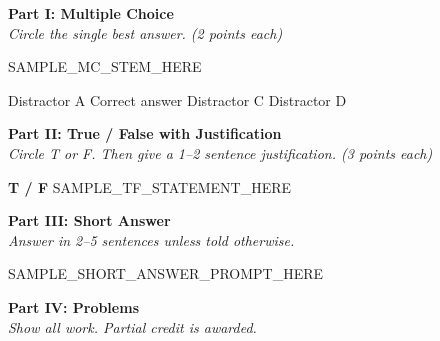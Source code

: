 \documentclass[11pt,addpoints]{exam}
\newcommand{\1}{\mathbf{1}}
\begin{document}
\newpage
\begin{center}
  {\large \textbf{Part I: Multiple Choice}} \\[3pt]
  \textit{Circle the single best answer. (2 points each)}
\end{center}

\begin{questions}

\question[2]
SAMPLE_MC_STEM_HERE
\begin{choices}
  \choice Distractor A
  \CorrectChoice Correct answer
  \choice Distractor C
  \choice Distractor D
\end{choices}


\newpage
\begin{center}
  {\large \textbf{Part II: True / False with Justification}} \\[3pt]
  \textit{Circle T or F. Then give a 1--2 sentence justification. (3 points each)}
\end{center}

\question[3]
\textbf{T \quad / \quad F} \quad SAMPLE_TF_STATEMENT_HERE
\vspace{1.2cm}


\newpage
\begin{center}
  {\large \textbf{Part III: Short Answer}} \\[3pt]
  \textit{Answer in 2--5 sentences unless told otherwise.}
\end{center}

\question[7]
SAMPLE_SHORT_ANSWER_PROMPT_HERE
\makeemptybox{4cm}


\newpage
\begin{center}
  {\large \textbf{Part IV: Problems}} \\[3pt]
  \textit{Show all work. Partial credit is awarded.}
\end{center}


\end{questions}
\end{document}
